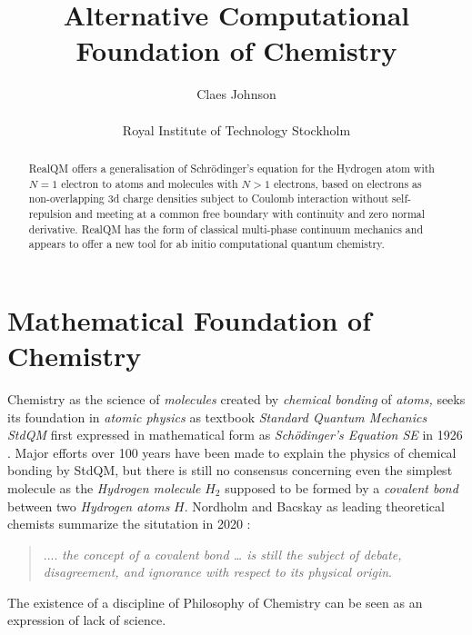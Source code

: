 \documentclass[11pt]{article} %
\title{Alternative Computational Foundation of Chemistry}
\author{Claes Johnson\\
\\
\small{Royal Institute of Technology Stockholm}}
\begin{document}
\maketitle
\begin{abstract} RealQM offers a generalisation of Schr\"odinger's equation for the Hydrogen atom with $N=1$ electron to atoms and molecules with $N>1$ electrons,  based on electrons as non-overlapping 3d charge densities subject to Coulomb interaction without self-repulsion and meeting at a common free boundary with continuity and zero normal derivative.  RealQM has the form of classical multi-phase continuum mechanics and appears to offer a new tool for ab initio computational quantum chemistry. 
\end{abstract}  

\section{Mathematical Foundation of Chemistry}
Chemistry as the science of \emph{molecules} created by \emph{chemical bonding} of \emph{atoms,}  seeks its foundation in \emph{atomic physics} as textbook \emph{Standard Quantum Mechanics StdQM} first expressed in mathematical form as \emph{Sch\"odinger's Equation SE} in 1926 \cite{piela, primas,koch, scerri,bader}. Major efforts over 100 years have been made to explain the physics of chemical bonding by StdQM,  but there is still no consensus concerning even the simplest molecule as the \emph{Hydrogen molecule} $H_2$ supposed to be formed by a \emph{covalent bond} between two \emph{Hydrogen atoms} $H$.  Nordholm and Bacskay as leading theoretical chemists summarize the situtation in 2020 \cite{nordholm}:
\begin{quote}
.... \emph{the concept of a covalent bond … is still the subject of debate,  disagreement,  and ignorance with respect to its physical origin}.
\end{quote}
The existence of a discipline of Philosophy of Chemistry can be seen as an expression of lack of science.
\end{document}
